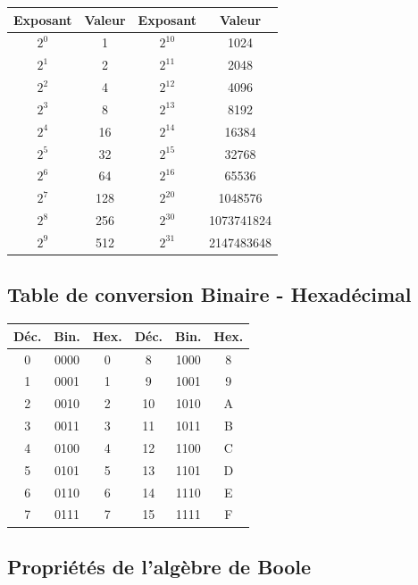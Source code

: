 \documentclass[12pt,a4paper]{article}
\begin{document}
\begin{center}
\begin{tabular}{|c|c||c|c|}
\hline
\textbf{Exposant} & \textbf{Valeur} & \textbf{Exposant} & \textbf{Valeur} \\
\hline
$2^0$ & 1 & $2^{10}$ & 1024 \\
$2^1$ & 2 & $2^{11}$ & 2048 \\
$2^2$ & 4 & $2^{12}$ & 4096 \\
$2^3$ & 8 & $2^{13}$ & 8192 \\
$2^4$ & 16 & $2^{14}$ & 16384 \\
$2^5$ & 32 & $2^{15}$ & 32768 \\
$2^6$ & 64 & $2^{16}$ & 65536 \\
$2^7$ & 128 & $2^{20}$ & 1048576 \\
$2^8$ & 256 & $2^{30}$ & 1073741824 \\
$2^9$ & 512 & $2^{31}$ & 2147483648 \\
\hline
\end{tabular}
\end{center}

\subsection*{Table de conversion Binaire - Hexadécimal}

\begin{center}
\begin{tabular}{|c|c|c||c|c|c|}
\hline
\textbf{Déc.} & \textbf{Bin.} & \textbf{Hex.} & \textbf{Déc.} & \textbf{Bin.} & \textbf{Hex.} \\
\hline
0 & 0000 & 0 & 8 & 1000 & 8 \\
1 & 0001 & 1 & 9 & 1001 & 9 \\
2 & 0010 & 2 & 10 & 1010 & A \\
3 & 0011 & 3 & 11 & 1011 & B \\
4 & 0100 & 4 & 12 & 1100 & C \\
5 & 0101 & 5 & 13 & 1101 & D \\
6 & 0110 & 6 & 14 & 1110 & E \\
7 & 0111 & 7 & 15 & 1111 & F \\
\hline
\end{tabular}
\end{center}

\subsection*{Propriétés de l'algèbre de Boole}
\end{document}
